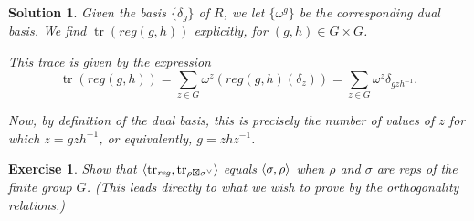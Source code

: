 \documentclass{article}
\newtheorem{ex}{Exercise}
\theoremstyle{nonumberplain}
\newtheorem{sol}{Solution}
\newcommand{\reg}{\mathit{reg}}
\newcommand{\cg}{\vee}
\DeclareMathOperator{\trace}{tr}
\DeclarePairedDelimiter{\braket}{\langle}{\rangle}
\begin{document}
\begin{sol}
Given the basis $\{\delta_g\}$ of $R$, we let $\{\omega^g\}$ be the corresponding dual basis. We find $\trace(\reg(g,h))$ explicitly, for $(g,h) \in G \times G$.

This trace is given by the expression
\begin{equation}
\trace(\reg(g,h)) = \sum_{z \in G} \omega^z(\reg(g,h)(\delta_z)) = \sum_{z \in G} \omega^z \delta_{g z h^{-1}}.
\end{equation}

Now, by definition of the dual basis, this is precisely the number of values of $z$ for which $z = g z h^{-1}$, or equivalently, $g = z h z^{-1}$.
\end{sol}

\begin{ex}
Show that $\braket{\trace_\reg, \trace_{\rho \boxtimes \sigma^\cg}}$ equals $\braket{\sigma, \rho}$ when $\rho$ and $\sigma$ are reps of the finite group $G$. (This leads directly to what we wish to prove by the orthogonality relations.)
\end{ex}
\end{document}
